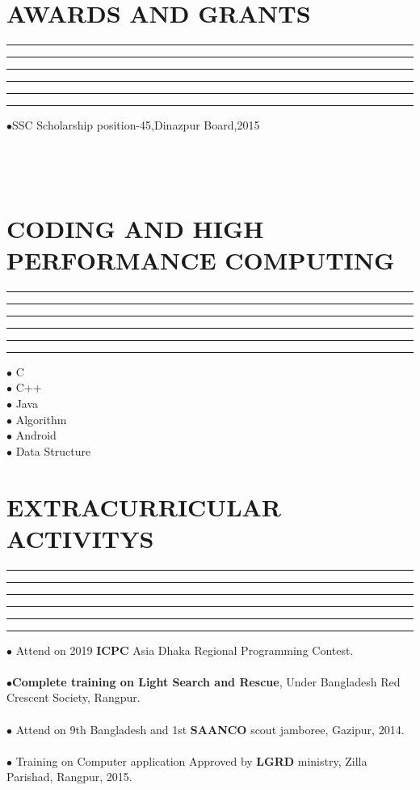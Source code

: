 \documentclass{article}
\begin{document}
\section*{\color{blue}AWARDS AND GRANTS}
\hrule \hrule \hrule \hrule \hrule \hrule
\vspace{0.4cm}
$\bullet$\hspace{0.2cm}SSC Scholarship position-45,Dinazpur Board,2015 
\\
\\
\\
\\
\section*{\color{blue}CODING AND HIGH PERFORMANCE COMPUTING }
\hrule \hrule \hrule \hrule \hrule \hrule
\vspace{0.4cm}
$\bullet$ \hspace{0.2cm}C \\
$\bullet$ \hspace{0.2cm}C++\\
 $\bullet$ \hspace{0.2cm}Java \\
 $\bullet$ \hspace{0.2cm}Algorithm\\
 $\bullet$ \hspace{0.2cm}Android\\
 $\bullet$ \hspace{0.2cm}Data Structure\\

 \section*{\color{blue}EXTRACURRICULAR ACTIVITYS }
 \hrule \hrule \hrule \hrule \hrule \hrule
 \vspace{0.4cm}
 $\bullet$\hspace{0.2cm} Attend on  2019 \textbf{ICPC} Asia Dhaka Regional Programming Contest.\\
 \\
 $\bullet$\hspace{0.2cm}\textbf{Complete training on Light Search and Rescue}, Under Bangladesh \hspace*{0.4cm}Red Crescent Society, Rangpur.\\
 \\
 $\bullet$ \hspace{0.2cm}Attend on 9th  Bangladesh and 1st  \textbf{SAANCO} scout jamboree,  Gazipur, \hspace*{0.5cm}2014.\\
 \\
 $\bullet$ \hspace{0.2cm}Training on Computer application Approved by \textbf{LGRD} ministry, Zilla Parishad, \hspace*{0.4cm}Rangpur, 2015. \\
 
\end{document}

